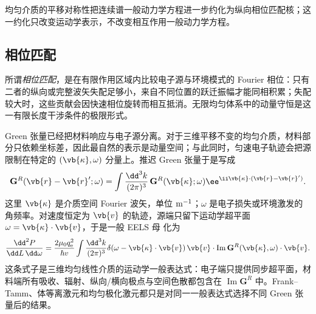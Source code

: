 均匀介质的平移对称性把连续谱一般动力学方程进一步约化为纵向相位匹配核；这一约化只改变运动学表示，不改变相互作用一般动力学方程。





\subsection{相位匹配}

所谓\emph{相位匹配}，是在有限作用区域内比较电子源与环境模式的 Fourier 相位：只有二者的纵向或完整波矢失配足够小，来自不同位置的跃迁振幅才能同相积累；失配较大时，这些贡献会因快速相位旋转而相互抵消。无限均匀体系中的动量守恒是这一有限长度干涉条件的极限形式。

Green 张量已经把材料响应与电子源分离。对于三维平移不变的均匀介质，材料部分只依赖坐标差，因此最自然的表示是动量空间；与此同时，匀速电子轨迹会把源限制在特定的 $(\vb{\kappa},\omega)$ 分量上。推迟 Green 张量于是写成
\begin{equation*}
\mathbf G^R(\vb{r}-\vb{r}';\omega)
=\int\frac{\dd^3 k}{(2\pi)^3}\,
\mathbf G^R(\vb{\kappa};\omega)
\ee^{\ii\vb{\kappa}\cdot(\vb{r}-\vb{r}')}.
\end{equation*}
这里 $\vb{\kappa}$ 是介质空间 Fourier 波矢，单位 ${\rm m^{-1}}$；$\omega$ 是电子损失或环境激发的角频率。对速度恒定为 $\vb{v}$ 的轨迹，源端只留下运动学超平面 $\omega=\vb{\kappa}\cdot\vb{v}$，于是一般 EELS 母 化为
\begin{equation}
{
\frac{\dd^2 P}{\dd L\,\dd\omega}
=\frac{2\mu_0q_{\mathrm e}^2}{\hbar v}
\int\frac{\dd^3 k}{(2\pi)^3}
\delta(\omega-\vb{\kappa}\cdot\vb{v})
\,\vb{v}\cdot\operatorname{Im}\mathbf G^R(\vb{\kappa},\omega)\cdot\vb{v}.}
\label{eq:homogeneous_green_loss_general}
\end{equation}
这条式子是三维均匀线性介质的运动学一般表达式：电子端只提供同步超平面，材料端所有吸收、辐射、纵向/横向极点与空间色散都包含在 $\operatorname{Im}\mathbf G^R$ 中。Frank--Tamm、体等离激元和均匀极化激元都只是对同一一般表达式选择不同 Green 张量后的结果。

